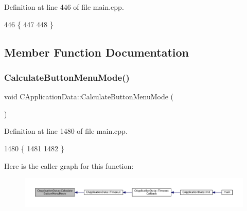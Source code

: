 Definition at line 446 of file main.\+cpp.


\begin{DoxyCode}
446                                    \{
447     
448 \}
\end{DoxyCode}


\subsection{Member Function Documentation}
\hypertarget{classCApplicationData_a5654dc28e14fa5bbc9ceb630d5259f91}{}\label{classCApplicationData_a5654dc28e14fa5bbc9ceb630d5259f91} 
\subsubsection{\texorpdfstring{Calculate\+Button\+Menu\+Mode()}{CalculateButtonMenuMode()}}
{\footnotesize\ttfamily void C\+Application\+Data\+::\+Calculate\+Button\+Menu\+Mode (\begin{DoxyParamCaption}{ }\end{DoxyParamCaption})\hspace{0.3cm}{\ttfamily [protected]}}



Definition at line 1480 of file main.\+cpp.


\begin{DoxyCode}
1480                                               \{
1481 
1482 \}
\end{DoxyCode}
Here is the caller graph for this function\+:
\nopagebreak
\begin{figure}[H]
\begin{center}
\leavevmode
\includegraphics[width=350pt]{classCApplicationData_a5654dc28e14fa5bbc9ceb630d5259f91_icgraph}
\end{center}
\end{figure}
\hypertarget{classCApplicationData_a9fa1176cd629742424f29ab20c212142}{}\label{classCApplicationData_a9fa1176cd629742424f29ab20c212142} 
